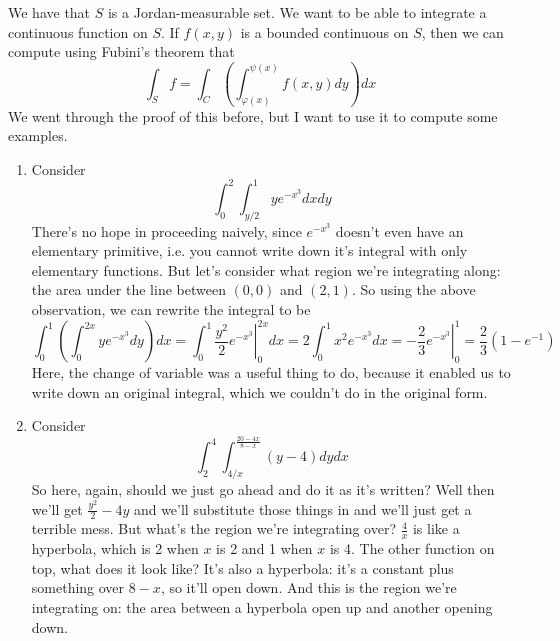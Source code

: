 \documentclass{article}
\begin{document}
We have that \(S\) is a Jordan-measurable set. We want to be able to integrate a continuous function on \(S\). If \(f(x, y)\) is a bounded continuous on \(S\), then we can compute using Fubini's theorem that
\begin{equation}
  \int_Sf = \int_C\left(\int_{\varphi(x)}^{\psi(x)}f(x, y)dy\right)dx
\end{equation}
We went through the proof of this before, but I want to use it to compute some examples.
\begin{enumerate}

  \item Consider
  \begin{equation}
    \int_0^2\int_{y/2}^1ye^{-x^3}dxdy
  \end{equation}
  There's no hope in proceeding naively, since \(e^{-x^3}\) doesn't even have an elementary primitive, i.e. you cannot write down it's integral with only elementary functions. But let's consider what region we're integrating along: the area under the line between \((0, 0)\) and \((2, 1)\). So using the above observation, we can rewrite the integral to be
  \begin{equation}
    \int_0^1\left(\int_0^{2x}ye^{-x^3}dy\right)dx = \int_0^1\left.\frac{y^2}{2}e^{-x^3}\right|_0^{2x}dx = 2\int_0^1x^2e^{-x^3}dx = \left.-\frac{2}{3}e^{-x^3}\right|_{0}^{1} = \frac{2}{3}(1 - e^{-1})
  \end{equation}
  Here, the change of variable was a useful thing to do, because it enabled us to write down an original integral, which we couldn't do in the original form.

  \item Consider
  \begin{equation}
    \int_2^4\int_{4/x}^{\frac{20 - 4x}{8 - x}}(y - 4)dydx
  \end{equation}
  So here, again, should we just go ahead and do it as it's written? Well then we'll get \(\frac{y^2}{2} - 4y\) and we'll substitute those things in and we'll just get a terrible mess. But what's the region we're integrating over? \(\frac{4}{x}\) is like a hyperbola, which is 2 when \(x\) is 2 and 1 when \(x\) is 4. The other function on top, what does it look like? It's also a hyperbola: it's a constant plus something over \(8 - x\), so it'll open down. And this is the region we're integrating on: the area between a hyperbola open up and another opening down.


\end{enumerate}
\end{document}
